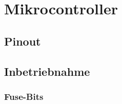 \section{Mikrocontroller}\label{Appendix:Mikrocontroller}

\subsection{Pinout}




\subsection{Inbetriebnahme}\label{Appendix:Inbetriebnahme_uC}

\subsubsection{Fuse-Bits}


%
%
%

